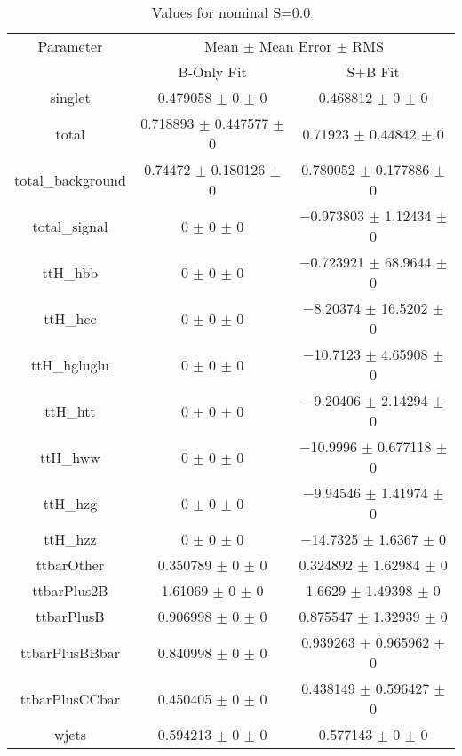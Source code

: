 \begin{table}
\centering
\caption{Values for nominal S=0.0}
\begin{tabular}{ccc}
\toprule
Parameter & \multicolumn{2}{c}{Mean $\pm$ Mean Error $\pm$ RMS}\\
 & B-Only Fit & S+B Fit\\
\midrule
singlet & \num{0.479058} $\pm$ \num{0} $\pm$ \num{0} & \num{0.468812} $\pm$ \num{0} $\pm$ \num{0}\\
total & \num{0.718893} $\pm$ \num{0.447577} $\pm$ \num{0} & \num{0.71923} $\pm$ \num{0.44842} $\pm$ \num{0}\\
total\_background & \num{0.74472} $\pm$ \num{0.180126} $\pm$ \num{0} & \num{0.780052} $\pm$ \num{0.177886} $\pm$ \num{0}\\
total\_signal & \num{0} $\pm$ \num{0} $\pm$ \num{0} & \num{-0.973803} $\pm$ \num{1.12434} $\pm$ \num{0}\\
ttH\_hbb & \num{0} $\pm$ \num{0} $\pm$ \num{0} & \num{-0.723921} $\pm$ \num{68.9644} $\pm$ \num{0}\\
ttH\_hcc & \num{0} $\pm$ \num{0} $\pm$ \num{0} & \num{-8.20374} $\pm$ \num{16.5202} $\pm$ \num{0}\\
ttH\_hgluglu & \num{0} $\pm$ \num{0} $\pm$ \num{0} & \num{-10.7123} $\pm$ \num{4.65908} $\pm$ \num{0}\\
ttH\_htt & \num{0} $\pm$ \num{0} $\pm$ \num{0} & \num{-9.20406} $\pm$ \num{2.14294} $\pm$ \num{0}\\
ttH\_hww & \num{0} $\pm$ \num{0} $\pm$ \num{0} & \num{-10.9996} $\pm$ \num{0.677118} $\pm$ \num{0}\\
ttH\_hzg & \num{0} $\pm$ \num{0} $\pm$ \num{0} & \num{-9.94546} $\pm$ \num{1.41974} $\pm$ \num{0}\\
ttH\_hzz & \num{0} $\pm$ \num{0} $\pm$ \num{0} & \num{-14.7325} $\pm$ \num{1.6367} $\pm$ \num{0}\\
ttbarOther & \num{0.350789} $\pm$ \num{0} $\pm$ \num{0} & \num{0.324892} $\pm$ \num{1.62984} $\pm$ \num{0}\\
ttbarPlus2B & \num{1.61069} $\pm$ \num{0} $\pm$ \num{0} & \num{1.6629} $\pm$ \num{1.49398} $\pm$ \num{0}\\
ttbarPlusB & \num{0.906998} $\pm$ \num{0} $\pm$ \num{0} & \num{0.875547} $\pm$ \num{1.32939} $\pm$ \num{0}\\
ttbarPlusBBbar & \num{0.840998} $\pm$ \num{0} $\pm$ \num{0} & \num{0.939263} $\pm$ \num{0.965962} $\pm$ \num{0}\\
ttbarPlusCCbar & \num{0.450405} $\pm$ \num{0} $\pm$ \num{0} & \num{0.438149} $\pm$ \num{0.596427} $\pm$ \num{0}\\
wjets & \num{0.594213} $\pm$ \num{0} $\pm$ \num{0} & \num{0.577143} $\pm$ \num{0} $\pm$ \num{0}\\
\bottomrule
\end{tabular}
\end{table}
